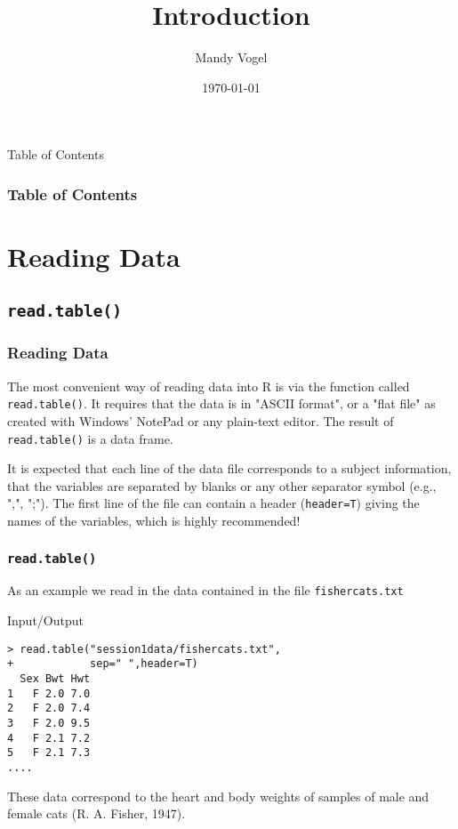 \documentclass[xcolor={table},c]{beamer}
\begin{document}
\title{Introduction}   
\author{Mandy Vogel} 
\date{\today}


\begin{frame}
\titlepage
\end{frame}

\begin{frame}[allowframebreaks,t]{Table of Contents}
\frametitle{Table of Contents}\tableofcontents
\end{frame}


\section{Reading Data}
\subsection{\texttt{read.table()}}
\begin{frame}\frametitle{Reading Data}
The most convenient way of reading data into R is via the function called
 \texttt{read.table()}. It requires that the data is in "ASCII format", or a "flat file" as
created with Windows' NotePad or any plain-text editor. The result of   \texttt{read.table()} is a
data frame.

\vspace*{0.5cm}

It is expected that each line of the data file corresponds to a subject information, that the
variables are separated by blanks or any other separator symbol (e.g., ",", ";"). The first
line of the file can contain a header (\texttt{header=T}) giving the names of the variables, which is highly
recommended!
\end{frame}

\begin{frame}[fragile]\frametitle{\texttt{read.table()}}
As an example we read in the data contained in the file \texttt{fishercats.txt} 
\begin{exampleblock}{Input/Output}\small
\begin{verbatim}
> read.table("session1data/fishercats.txt",  
+            sep=" ",header=T)
  Sex Bwt Hwt
1   F 2.0 7.0
2   F 2.0 7.4
3   F 2.0 9.5
4   F 2.1 7.2
5   F 2.1 7.3
....
\end{verbatim}
\end{exampleblock}
These data correspond to the heart and body weights of samples of male and female cats (R. A. Fisher, 1947).
\end{frame}
\end{document}
